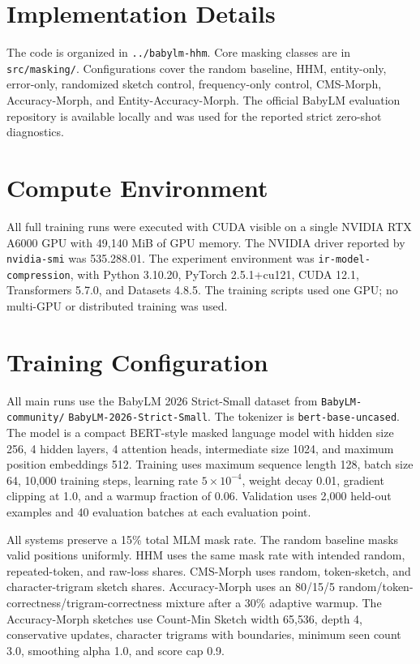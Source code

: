 \appendix

\section{Implementation Details}

The code is organized in \texttt{../babylm-hhm}. Core masking classes are in \texttt{src/masking/}. Configurations cover the random baseline, HHM, entity-only, error-only, randomized sketch control, frequency-only control, CMS-Morph, Accuracy-Morph, and Entity-Accuracy-Morph. The official BabyLM evaluation repository is available locally and was used for the reported strict zero-shot diagnostics.

\section{Compute Environment}

All full training runs were executed with CUDA visible on a single NVIDIA RTX A6000 GPU with 49{,}140 MiB of GPU memory. The NVIDIA driver reported by \texttt{nvidia-smi} was 535.288.01. The experiment environment was \texttt{ir-model-compression}, with Python 3.10.20, PyTorch 2.5.1+cu121, CUDA 12.1, Transformers 5.7.0, and Datasets 4.8.5. The training scripts used one GPU; no multi-GPU or distributed training was used.

\section{Training Configuration}

All main runs use the BabyLM 2026 Strict-Small dataset from \texttt{BabyLM-community/} \texttt{BabyLM-2026-Strict-Small}. The tokenizer is \texttt{bert-base-uncased}. The model is a compact BERT-style masked language model with hidden size 256, 4 hidden layers, 4 attention heads, intermediate size 1024, and maximum position embeddings 512. Training uses maximum sequence length 128, batch size 64, 10{,}000 training steps, learning rate $5 \times 10^{-4}$, weight decay 0.01, gradient clipping at 1.0, and a warmup fraction of 0.06. Validation uses 2{,}000 held-out examples and 40 evaluation batches at each evaluation point.

All systems preserve a 15\% total MLM mask rate. The random baseline masks valid positions uniformly. HHM uses the same mask rate with intended random, repeated-token, and raw-loss shares. CMS-Morph uses random, token-sketch, and character-trigram sketch shares. Accuracy-Morph uses an 80/15/5 random/token-correctness/trigram-correctness mixture after a 30\% adaptive warmup. The Accuracy-Morph sketches use Count-Min Sketch width 65{,}536, depth 4, conservative updates, character trigrams with boundaries, minimum seen count 3.0, smoothing alpha 1.0, and score cap 0.9.


